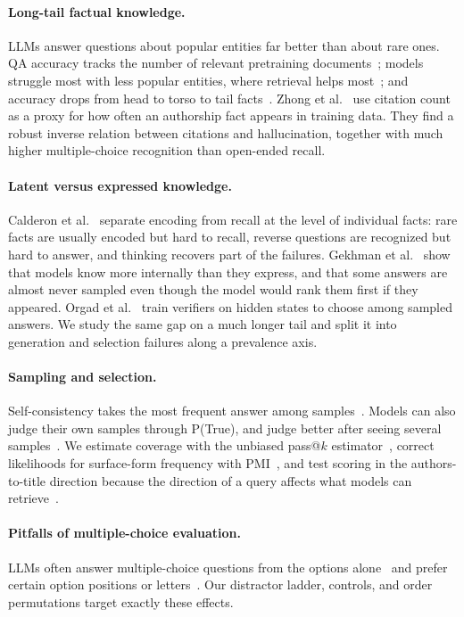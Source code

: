 \documentclass[sigconf,nonacm]{acmart}
\begin{document}
\paragraph{Long-tail factual knowledge.}
LLMs answer questions about popular entities far better than about rare ones. QA accuracy tracks the number of relevant pretraining documents~\cite{kandpal2023longtail}; models struggle most with less popular entities, where retrieval helps most~\cite{mallen2023popqa}; and accuracy drops from head to torso to tail facts~\cite{sun2024headtotail}. Zhong et al.~\cite{zhong2026dreaming} use citation count as a proxy for how often an authorship fact appears in training data. They find a robust inverse relation between citations and hallucination, together with much higher multiple-choice recognition than open-ended recall.

\paragraph{Latent versus expressed knowledge.}
Calderon et al.~\cite{calderon2026emptyshelves} separate encoding from recall at the level of individual facts: rare facts are usually encoded but hard to recall, reverse questions are recognized but hard to answer, and thinking recovers part of the failures. Gekhman et al.~\cite{gekhman2025insideout} show that models know more internally than they express, and that some answers are almost never sampled even though the model would rank them first if they appeared. Orgad et al.~\cite{orgad2025llms} train verifiers on hidden states to choose among sampled answers. We study the same gap on a much longer tail and split it into generation and selection failures along a prevalence axis.

\paragraph{Sampling and selection.}
Self-consistency takes the most frequent answer among samples~\cite{wang2023selfconsistency}. Models can also judge their own samples through P(True), and judge better after seeing several samples~\cite{kadavath2022language}. We estimate coverage with the unbiased pass@$k$ estimator~\cite{chen2021codex}, correct likelihoods for surface-form frequency with PMI~\cite{holtzman2021surface}, and test scoring in the authors-to-title direction because the direction of a query affects what models can retrieve~\cite{berglund2024reversal}.

\paragraph{Pitfalls of multiple-choice evaluation.}
LLMs often answer multiple-choice questions from the options alone~\cite{balepur2024artifacts} and prefer certain option positions or letters~\cite{zheng2024mcq}. Our distractor ladder, controls, and order permutations target exactly these effects.
\end{document}
